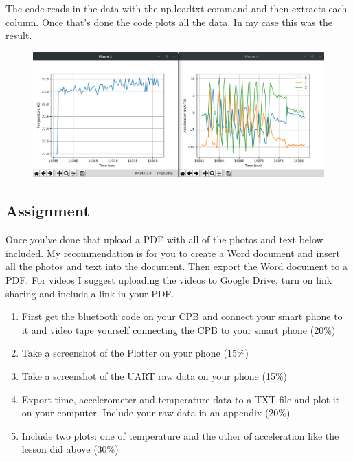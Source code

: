 The code reads in the data with the np.loadtxt command and then extracts each column. Once that's done the code plots all the data. In my case this was the result.
\begin{figure}[H]
  \begin{center}
    \includegraphics[width=\textwidth]{Figures/phoneapp_plots.png}
  \end{center}
\end{figure}

\subsection{Assignment}

Once you've done that upload a PDF with all of the photos and text below included. My recommendation is for you to create a Word document and insert all the photos and text into the document. Then export the Word document to a PDF. For videos I suggest uploading the videos to Google Drive, turn on link sharing and include a link in your PDF.
\begin{enumerate}[itemsep=-5pt]
\item First get the bluetooth code on your CPB and connect your smart phone to it and video tape yourself connecting the CPB to your smart phone (20\%)
\item Take a screenshot of the Plotter on your phone (15\%)
\item Take a screenshot of the UART raw data on your phone (15\%)
\item Export time, accelerometer and temperature data to a TXT file and plot it on your computer. Include your raw data in an appendix (20\%)
\item Include two plots: one of temperature and the other of acceleration like the lesson did above (30\%)
\end{enumerate}
